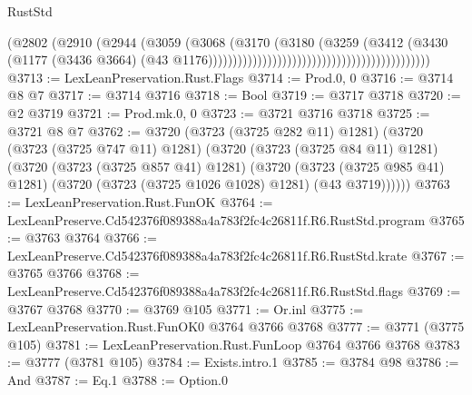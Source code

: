 \begin{lexlean}{RustStd}
\begin{coremodule}
                                                                      (@2802
                                                                        (@2910
                                                                          (@2944
                                                                            (@3059
                                                                              (@3068
                                                                                (@3170
                                                                                  (@3180
                                                                                    (@3259
                                                                                      (@3412
                                                                                        (@3430
                                                                                          (@1177
                                                                                            (@3436
                                                                                              @3664)
                                                                                            (@43
                                                                                              @1176)))))))))))))))))))))))))))))))))))))))))))))
@3713 := LexLeanPreservation.Rust.Flags
@3714 := Prod.{0, 0}
@3716 := @3714 @8 @7
@3717 := @3714 @3716
@3718 := Bool
@3719 := @3717 @3718
@3720 := @2 @3719
@3721 := Prod.mk.{0, 0}
@3723 := @3721 @3716 @3718
@3725 := @3721 @8 @7
@3762 := @3720
    (@3723 (@3725 @282 @11) @1281)
    (@3720
      (@3723 (@3725 @747 @11) @1281)
      (@3720
        (@3723 (@3725 @84 @11) @1281)
        (@3720
          (@3723 (@3725 @857 @41) @1281)
          (@3720
            (@3723 (@3725 @985 @41) @1281)
            (@3720 (@3723 (@3725 @1026 @1028) @1281) (@43 @3719))))))
@3763 := LexLeanPreservation.Rust.FunOK
@3764 := LexLeanPreserve.Cd542376f089388a4a783f2fc4c26811f.R6.RustStd.program
@3765 := @3763 @3764
@3766 := LexLeanPreserve.Cd542376f089388a4a783f2fc4c26811f.R6.RustStd.krate
@3767 := @3765 @3766
@3768 := LexLeanPreserve.Cd542376f089388a4a783f2fc4c26811f.R6.RustStd.flags
@3769 := @3767 @3768
@3770 := @3769 @105
@3771 := Or.inl
@3775 := LexLeanPreservation.Rust.FunOK0 @3764 @3766 @3768
@3777 := @3771 (@3775 @105)
@3781 := LexLeanPreservation.Rust.FunLoop @3764 @3766 @3768
@3783 := @3777 (@3781 @105)
@3784 := Exists.intro.{1}
@3785 := @3784 @98
@3786 := And
@3787 := Eq.{1}
@3788 := Option.{0}

\end{coremodule}
\end{lexlean}
